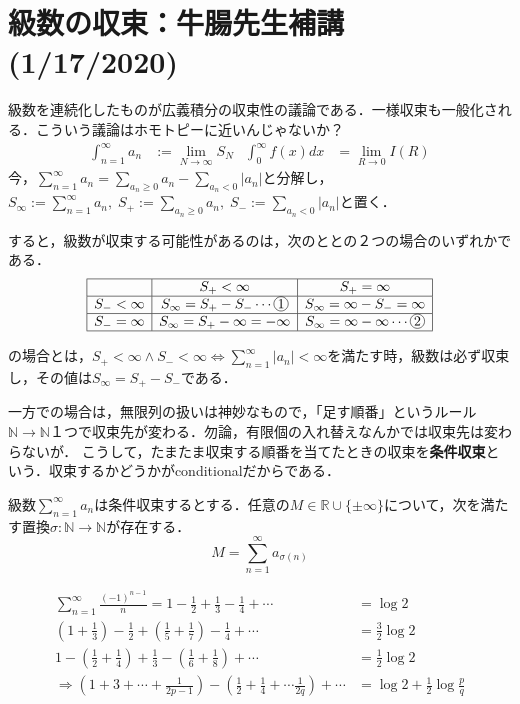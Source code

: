 \documentclass[uplatex, dvipdfmx]{jsreport}
\begin{document}
\section{級数の収束：牛腸先生補講(1/17/2020)}\label{section-Dr-Gocho}

級数を連続化したものが広義積分の収束性の議論である．一様収束も一般化される．こういう議論はホモトピーに近いんじゃないか？
\begin{align*}
    \int^\infty_{n=1}a_n&:=\lim_{N\to\infty}S_N & \int^\infty_0f(x)dx &= \lim_{R\to 0}I(R)
\end{align*}
今，$\sum^\infty_{n=1}a_n=\sum_{a_n\ge 0}a_n-\sum_{a_n<0}|a_n|$と分解し，$S_\infty:=\sum^\infty_{n=1}a_n,\; S_+:=\sum_{a_n\ge 0}a_n,\; S_-:=\sum_{a_n<0}|a_n|$と置く．

すると，級数が収束する可能性があるのは，次のととの２つの場合のいずれかである．
\[\begin{array}{|c|c|c|}\hline
    & S_+<\infty & S_+=\infty \\\hline
    S_-<\infty & S_\infty=S_+-S_-\cdots\circled{1} & S_\infty=\infty-S_-=\infty \\\hline
    S_-=\infty & S_\infty=S_+-\infty=-\infty & S_\infty=\infty-\infty \cdots\circled{2} \\\hline
\end{array}\]

の場合とは，$S_+<\infty\land S_-<\infty\Leftrightarrow \sum^\infty_{n=1}|a_n|<\infty$を満たす時，級数は必ず収束し，その値は$S_\infty=S_+-S_-$である．

一方での場合は，無限列の扱いは神妙なもので，「足す順番」というルール$\mathbb{N}\to\mathbb{N}$１つで収束先が変わる．勿論，有限個の入れ替えなんかでは収束先は変わらないが．
こうして，たまたま収束する順番を当てたときの収束を\textbf{条件収束}という．収束するかどうかがconditionalだからである．
\begin{theorem}
    級数$\sum^\infty_{n=1}a_n$は条件収束するとする．任意の$M\in\mathbb{R}\cup\{\pm\infty\}$について，次を満たす置換$\sigma:\mathbb{N}\to\mathbb{N}$が存在する．
    \[ M=\sum^\infty_{n=1}a_{\sigma(n)} \]
\end{theorem}
\begin{example}
    \begin{align*}
        \sum^\infty_{n=1}\frac{(-1)^{n-1}}{n}=1-\frac{1}{2}+\frac{1}{3}-\frac{1}{4}+\cdots &= \log 2 \\
        \left(1+\frac{1}{3}\right)-\frac{1}{2} + \left(\frac{1}{5}+\frac{1}{7}\right)-\frac{1}{4}+\cdots &= \frac{3}{2}\log 2 \\
        1-\left( \frac{1}{2}+\frac{1}{4} \right) + \frac{1}{3} - \left( \frac{1}{6} + \frac{1}{8} \right)+\cdots &= \frac{1}{2}\log 2\\
        \Longrightarrow \left( 1+3+\cdots +\frac{1}{2p-1} \right) - \left( \frac{1}{2} + \frac{1}{4} + \cdots \frac{1}{2q} \right) + \cdots&=\log 2 + \frac{1}{2}\log\frac{p}{q}
    \end{align*}
\end{example}
\end{document}
